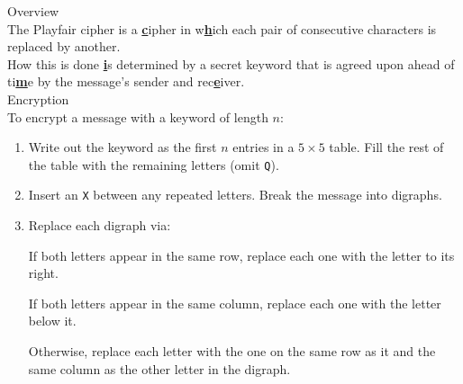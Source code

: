 \begin{minipage}{6cm}\raggedright
\textsf{\LARGE Overview}\\[1.0ex]

The Playfair cipher is a \underline{\textbf{c}}ipher in w\underline{\textbf{h}}ich each pair of consecutive characters is replaced by another.\\[1.25ex]

How this is done \underline{\textbf{i}}s determined by a secret keyword that is agreed upon ahead of ti\underline{\textbf{m}}e by the message's sender and rec\underline{\textbf{e}}iver.\\[3ex] 

\textsf{\LARGE Encryption}\\[1.0ex]

To encrypt a message with a keyword of length $n$:
\begin{enumerate}[leftmargin=*]
	\item Write out the keyword as the first $n$ entries in a $5\times 5$ table. Fill the rest of the table with the remaining letters (omit \texttt{Q}).\\[1.25ex]
	\item Insert an \texttt{X} between any repeated letters. Break the message into digraphs.  %
	\item Replace each digraph via:
	
	If both letters appear in the same row, replace each one with the letter to its right.
	
	If both letters appear in the same column, replace each one with the letter below it.
	
	
	Otherwise, replace each letter with the one on the same row as it and the same column as the other letter in the digraph.
\end{enumerate}
%
%
%
%
%
%
\end{minipage}
